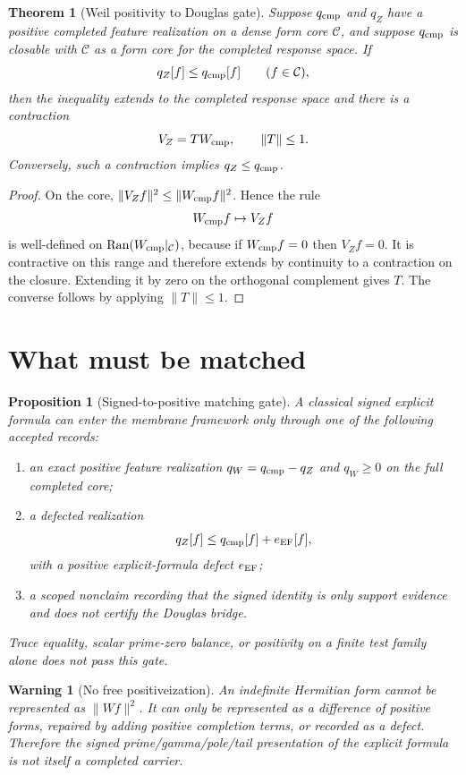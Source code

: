 \documentclass[11pt]{article}
\newtheorem{theorem}{Theorem}
\newtheorem{proposition}{Proposition}
\newtheorem{warning}{Warning}
\begin{document}
\begin{theorem}[Weil positivity to Douglas gate]
Suppose \(q_{\rm cmp}\) and \(q_Z\) have a positive completed feature realization on a dense form core \(\mathcal C\), and suppose \(q_{\rm cmp}\) is closable with \(\mathcal C\) as a form core for the completed response space.  If
\[
 q_Z[f]\le q_{\rm cmp}[f]
 \qquad (f\in\mathcal C),
\]
then the inequality extends to the completed response space and there is a contraction
\[
 V_Z=T W_{\rm cmp},\qquad \|T\|\le 1.
\]
Conversely, such a contraction implies \(q_Z\le q_{\rm cmp}\).
\end{theorem}

\begin{proof}
On the core, \(\|V_Zf\|^2\le\|W_{\rm cmp}f\|^2\).  Hence the rule
\[
 W_{\rm cmp}f\mapsto V_Zf
\]
is well-defined on \(\operatorname{Ran}(W_{\rm cmp}|_{\mathcal C})\), because if \(W_{\rm cmp}f=0\) then \(V_Zf=0\). It is contractive on this range and therefore extends by continuity to a contraction on the closure. Extending it by zero on the orthogonal complement gives \(T\). The converse follows by applying \(\|T\|\le1\).
\end{proof}

\section{What must be matched}

\begin{proposition}[Signed-to-positive matching gate]
A classical signed explicit formula can enter the membrane framework only through one of the following accepted records:
\begin{enumerate}[label=(\alph*)]
\item an exact positive feature realization \(q_W=q_{\rm cmp}-q_Z\) and \(q_W\ge0\) on the full completed core;
\item a defected realization
\[
 q_Z[f]\le q_{\rm cmp}[f]+e_{\rm EF}[f],
\]
with a positive explicit-formula defect \(e_{\rm EF}\);
\item a scoped nonclaim recording that the signed identity is only support evidence and does not certify the Douglas bridge.
\end{enumerate}
Trace equality, scalar prime-zero balance, or positivity on a finite test family alone does not pass this gate.
\end{proposition}

\begin{warning}[No free positiveization]
An indefinite Hermitian form cannot be represented as \(\|Wf\|^2\). It can only be represented as a difference of positive forms, repaired by adding positive completion terms, or recorded as a defect. Therefore the signed prime/gamma/pole/tail presentation of the explicit formula is not itself a completed carrier.
\end{warning}
\end{document}
